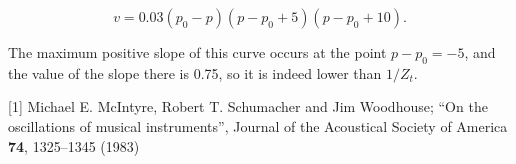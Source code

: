   $$v=0.03(p_0 -p)(p-p_0+5)(p-p_0+10) . \tag{11}$$ 

  The maximum positive slope of this curve occurs at the point $p-p_0=-5$, and 
  the value of the slope there is 0.75, so it is indeed lower than $1/Z_t$. 

  \sectionreferences{}[1] Michael E. McIntyre, Robert T. Schumacher and Jim 
  Woodhouse; ``On the oscillations of musical instruments'', Journal of the 
  Acoustical Society of America \textbf{74}, 1325--1345 (1983) 